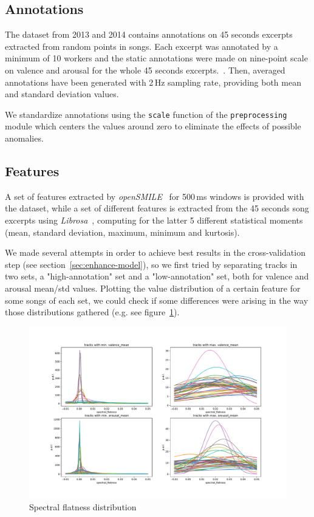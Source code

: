 \subsection{Annotations}\label{sec:annotations}

The dataset from 2013 and 2014 contains annotations on 45 seconds excerpts extracted from random points in songs. Each excerpt was annotated by a minimum of 10 workers and the static annotations were made on nine-point scale on valence and arousal for the whole 45 seconds excerpts.~\cite{aljanaki2017developing}.
Then, averaged annotations have been generated with 2\,Hz sampling rate, providing both mean and standard deviation values.~\cite{soleymani2016deam}

We standardize annotations using the \texttt{scale} function of the  \texttt{preprocessing} module which centers the values around zero to eliminate the effects of possible anomalies.


\subsection{Features}\label{sec:features}

A set of features extracted by \emph{openSMILE}~\cite{opensmile} for 500\,ms windows is provided with the dataset, while a set of different features is extracted from the 45 seconds song excerpts using \emph{Librosa}~\cite{librosa}, computing for the latter 5 different statistical moments (mean, standard deviation, maximum, minimum and kurtosis).

We made several attempts in order to achieve best results in the cross-validation step (see section~\ref{sec:enhance-model}), so we first tried by separating tracks in two sets, a "high-annotation" set and a "low-annotation" set, both for valence and arousal mean/std values. Plotting the value distribution of a certain feature for some songs of each set, we could check if some differences were arising in the way those distributions gathered (e.g. see figure~\ref{fig:va_mean-spectral_flatness-dists}).

\begin{figure}
	\centering
	\includegraphics[width=1\linewidth]{assets/va_mean-spectral_flatness-dists.pdf}
	\caption{Spectral flatness distribution}
	\label{fig:va_mean-spectral_flatness-dists}
\end{figure}

